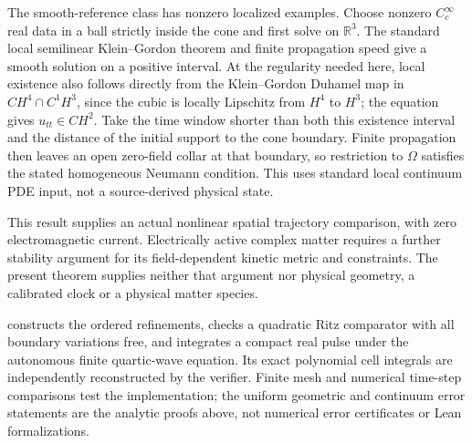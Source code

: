 The smooth-reference class has nonzero localized examples. Choose nonzero
\(C_c^\infty\) real data in a ball strictly inside the cone and first solve
on \(\mathbb R^3\). The standard local semilinear Klein--Gordon theorem
and finite propagation speed \cite{TaoNonlinearWaves} give a smooth solution
on a positive interval. At the regularity needed here, local existence
also follows directly from the Klein--Gordon Duhamel map in
\(C H^4\cap C^1H^3\), since the cubic is locally Lipschitz from
\(H^4\) to \(H^3\); the equation gives \(u_{tt}\in C H^2\).
Take the time window shorter than both this existence interval and the
distance of the initial support to the cone boundary. Finite propagation
then leaves an open zero-field collar at that boundary, so restriction to
\(\Omega\) satisfies the stated homogeneous Neumann condition. This uses
standard local continuum PDE input, not a source-derived physical state.

This result supplies an actual nonlinear spatial trajectory comparison,
with zero electromagnetic current. Electrically active complex matter
requires a further stability argument for its field-dependent kinetic
metric and constraints. The present theorem supplies neither that argument
nor physical geometry, a calibrated clock or a physical matter species.

 constructs the
ordered refinements, checks a quadratic Ritz comparator with all boundary
variations free, and integrates a compact real pulse under the autonomous
finite quartic-wave equation. Its exact polynomial cell integrals are
independently reconstructed by the verifier. Finite mesh and numerical
time-step comparisons test the implementation; the uniform geometric and
continuum error statements are the analytic proofs above, not numerical
error certificates or Lean formalizations.
